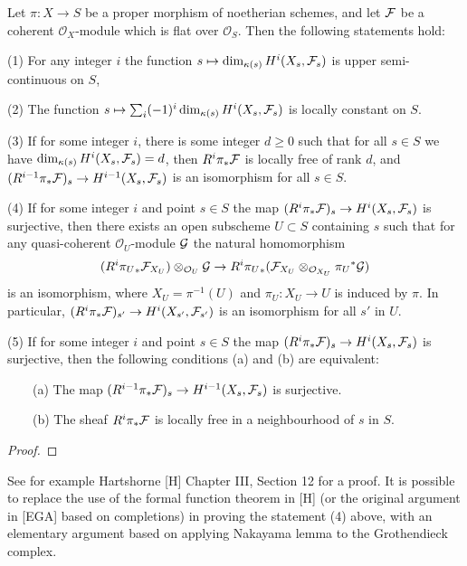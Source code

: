 \begin{theorem}\label{nhq-base-change-flat-sheaves}
Let $\pi: X\to S$ be a proper morphism of noetherian
schemes, and let $\mathcal{F}$ be a coherent ${\mathcal O}_X$-module
which is flat over ${\mathcal O}_S$.
Then the following statements hold:

(1) For any integer $i$ the function $s\mapsto \operatorname{dim}_{\kappa(s)}H^i(X_s,\mathcal{F}_s)$
is upper semi-continuous on $S$,

(2) The function $s\mapsto \sum_i (-1)^i \operatorname{dim}_{\kappa(s)}H^i(X_s,\mathcal{F}_s)$
is locally constant on $S$.

(3) If for some integer $i$, there is some integer $d\ge 0$ such that
for all $s\in S$ we have $\operatorname{dim}_{\kappa(s)}H^i(X_s,\mathcal{F}_s) = d$,
then $R^i\pi_*\mathcal{F}$ is locally free of rank $d$,
and $(R^{i-1}\pi_*\mathcal{F})_s \to H^{i-1}(X_s,\mathcal{F}_s)$ is an isomorphism
for all $s\in S$.

(4) If for some integer $i$ and point $s\in S$ the map
$(R^i\pi_*\mathcal{F})_s \to H^i(X_s,\mathcal{F}_s)$ is surjective,
then there exists
an open subscheme $U\subset S$ containing $s$ such that
for any quasi-coherent ${\mathcal O}_U$-module $\mathcal{G}$ the natural homomorphism
$$(R^i {\pi_U}_*\mathcal{F}_{X_U})\otimes_{{\mathcal O}_U}\mathcal{G}\to
R^i{\pi_U}_*(\mathcal{F}_{X_U}\otimes_{{\mathcal O}_{X_U}}{\pi_U}^*\mathcal{G})$$
is an isomorphism, where $X_U = \pi^{-1}(U)$ and
$\pi_U: X_U \to U$ is induced by $\pi$. In particular,
$(R^i\pi_*\mathcal{F})_{s'} \to H^i(X_{s'},\mathcal{F}_{s'})$ is an isomorphism
for all $s'$ in $U$.


(5) If for some integer $i$ and point $s\in S$ the map
$(R^i\pi_*\mathcal{F})_s \to H^i(X_s,\mathcal{F}_s)$ is surjective,
then the following conditions (a) and (b) are equivalent:

~~~~(a) The map $(R^{i-1}\pi_*\mathcal{F})_s \to H^{i-1}(X_s,\mathcal{F}_s)$ is surjective.

~~~~(b) The sheaf $R^i\pi_*\mathcal{F}$ is locally free in a
        neighbourhood of $s$ in $S$.
\end{theorem}


\begin{proof}
\notready
\end{proof}

See for example Hartshorne [H] Chapter III, Section 12 for a proof.
It is possible to replace the use of the formal function
theorem in [H] (or the original argument in [EGA] based on
completions) in proving the statement (4) above,
with an elementary argument based on applying
Nakayama lemma to the Grothendieck complex.
